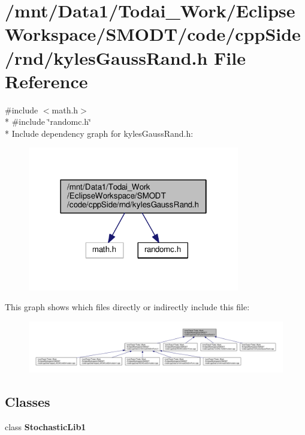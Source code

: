 \section{/mnt/\-Data1/\-Todai\-\_\-\-Work/\-Eclipse\-Workspace/\-S\-M\-O\-D\-T/code/cpp\-Side/rnd/kyles\-Gauss\-Rand.h File Reference}
\label{kyles_gauss_rand_8h}
{\ttfamily \#include $<$math.\-h$>$}\\*
{\ttfamily \#include \char`\"{}randomc.\-h\char`\"{}}\\*
Include dependency graph for kyles\-Gauss\-Rand.\-h\-:
\nopagebreak
\begin{figure}[H]
\begin{center}
\leavevmode
\includegraphics[width=262pt]{kyles_gauss_rand_8h__incl}
\end{center}
\end{figure}
This graph shows which files directly or indirectly include this file\-:
\nopagebreak
\begin{figure}[H]
\begin{center}
\leavevmode
\includegraphics[width=350pt]{kyles_gauss_rand_8h__dep__incl}
\end{center}
\end{figure}
\subsection*{Classes}
\begin{DoxyCompactItemize}
\item 
class {\bf Stochastic\-Lib1}
\end{DoxyCompactItemize}
